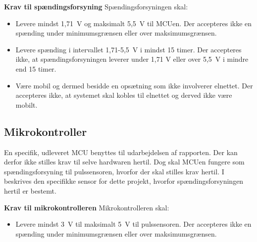 \textbf{Krav til spændingsforsyning} \newline 
Spændingsforsyningen skal:
\begin{itemize}
	\item Levere mindst 1,71~V og maksimalt 5,5~V til MCUen. Der accepteres ikke en spænding under minimumsgrænsen eller over maksimumsgrænsen.
	\item Levere spænding i intervallet 1,71-5,5~V i mindst 15 timer. Der accepteres ikke, at spændingsforsyningen leverer under 1,71 V eller over 5,5~V i mindre end 15 timer.
	\item Være mobil og dermed besidde en opsætning som ikke involverer elnettet. Der accepteres ikke, at systemet skal kobles til elnettet og derved ikke være mobilt.
\end{itemize}

\subsection{Mikrokontroller} \label{krav_mikro_spaending}
En specifik, udleveret MCU benyttes til udarbejdelsen af rapporten. Der kan derfor ikke stilles krav til selve hardwaren hertil. Dog skal MCUen fungere som spændingsforsyning til %
pulssensoren, hvorfor der skal stilles krav hertil. I %
 beskrives den specifikke sensor for dette projekt, hvorfor spændingsforsyningen hertil er bestemt.

\textbf{Krav til mikrokontrolleren} \newline 
Mikrokontrolleren skal:
\begin{itemize}
	\item Levere mindst 3~V til maksimalt 5~V til pulssensoren. Der accepteres ikke en spænding under minimumsgrænsen eller over maksimumsgrænsen.
\end{itemize}

